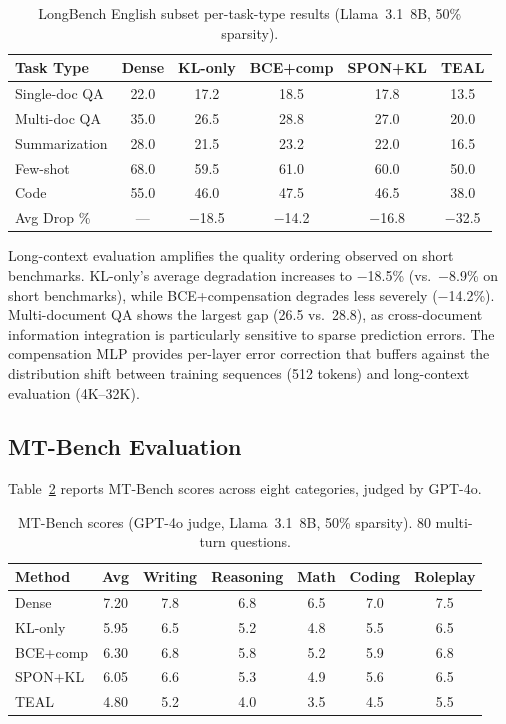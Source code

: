 \documentclass[11pt]{article}
\begin{document}
\begin{table}[h]
\centering
\caption{LongBench English subset per-task-type results (Llama~3.1~8B, 50\% sparsity).}
\label{tab:longbench}
\small
\begin{tabular}{lccccc}
\toprule
Task Type & Dense & KL-only & BCE+comp & SPON+KL & TEAL \\
\midrule
Single-doc QA & 22.0 & 17.2 & 18.5 & 17.8 & 13.5 \\
Multi-doc QA & 35.0 & 26.5 & 28.8 & 27.0 & 20.0 \\
Summarization & 28.0 & 21.5 & 23.2 & 22.0 & 16.5 \\
Few-shot & 68.0 & 59.5 & 61.0 & 60.0 & 50.0 \\
Code & 55.0 & 46.0 & 47.5 & 46.5 & 38.0 \\
\midrule
Avg Drop \% & --- & $-$18.5 & $-$14.2 & $-$16.8 & $-$32.5 \\
\bottomrule
\end{tabular}
\end{table}

Long-context evaluation amplifies the quality ordering observed on short benchmarks.
KL-only's average degradation increases to $-$18.5\% (vs.\ $-$8.9\% on short benchmarks), while BCE+compensation degrades less severely ($-$14.2\%).
Multi-document QA shows the largest gap (26.5 vs.\ 28.8), as cross-document information integration is particularly sensitive to sparse prediction errors.
The compensation MLP provides per-layer error correction that buffers against the distribution shift between training sequences (512 tokens) and long-context evaluation (4K--32K).

\subsection{MT-Bench Evaluation}

Table~\ref{tab:mtbench} reports MT-Bench scores across eight categories, judged by GPT-4o.

\begin{table}[h]
\centering
\caption{MT-Bench scores (GPT-4o judge, Llama~3.1~8B, 50\% sparsity). 80 multi-turn questions.}
\label{tab:mtbench}
\small
\begin{tabular}{lcccccc}
\toprule
Method & Avg & Writing & Reasoning & Math & Coding & Roleplay \\
\midrule
Dense & 7.20 & 7.8 & 6.8 & 6.5 & 7.0 & 7.5 \\
KL-only & 5.95 & 6.5 & 5.2 & 4.8 & 5.5 & 6.5 \\
BCE+comp & 6.30 & 6.8 & 5.8 & 5.2 & 5.9 & 6.8 \\
SPON+KL & 6.05 & 6.6 & 5.3 & 4.9 & 5.6 & 6.5 \\
TEAL & 4.80 & 5.2 & 4.0 & 3.5 & 4.5 & 5.5 \\
\bottomrule
\end{tabular}
\end{table}
\end{document}
